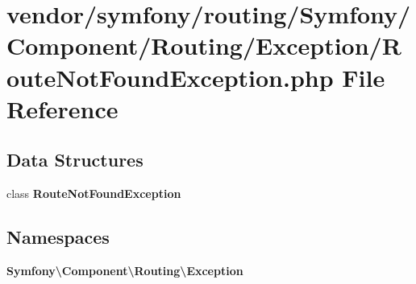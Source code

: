 \section{vendor/symfony/routing/\+Symfony/\+Component/\+Routing/\+Exception/\+Route\+Not\+Found\+Exception.php File Reference}
\label{_route_not_found_exception_8php}
\subsection*{Data Structures}
\begin{DoxyCompactItemize}
\item 
class {\bf Route\+Not\+Found\+Exception}
\end{DoxyCompactItemize}
\subsection*{Namespaces}
\begin{DoxyCompactItemize}
\item 
 {\bf Symfony\textbackslash{}\+Component\textbackslash{}\+Routing\textbackslash{}\+Exception}
\end{DoxyCompactItemize}
